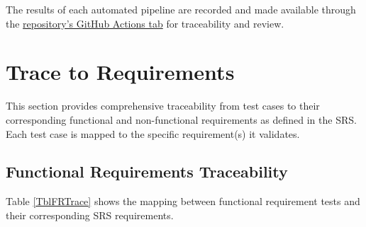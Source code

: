 \documentclass[12pt, titlepage]{article}
\begin{document}
The results of each automated pipeline are recorded and made available through
the \href{https://github.com/Team6-SixSense/audio360/actions}{repository's
GitHub Actions tab} for traceability and review.
		
\section{Trace to Requirements}

This section provides comprehensive traceability from test cases to their
corresponding functional and non-functional requirements as defined in the SRS.
Each test case is mapped to the specific requirement(s) it validates.

\subsection{Functional Requirements Traceability}

Table \ref{TblFRTrace} shows the mapping between functional requirement tests
and their corresponding SRS requirements.
\end{document}
